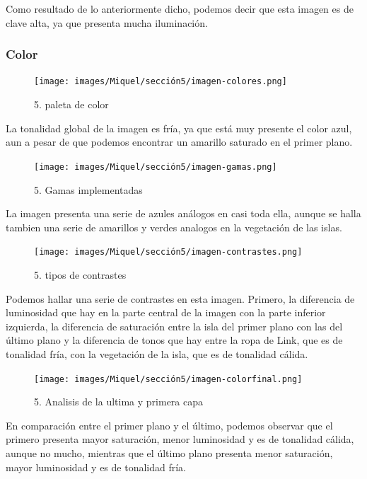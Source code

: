 \documentclass[12pt]{article}
\begin{document}
Como resultado de lo anteriormente dicho, podemos decir que esta imagen es de clave alta, ya que presenta mucha iluminación.

        \subsubsection{Color}

 \begin{figure}[H]
      \centering
      \texttt{[image: images/Miquel/sección5/imagen-colores.png]}
      \caption{\small 5. paleta de color}
    \end{figure}

     La tonalidad global de la imagen es fría, ya que está muy presente el color azul, aun a pesar de que podemos encontrar un amarillo saturado en el primer plano.  

\begin{figure}[H]
      \centering
      \texttt{[image: images/Miquel/sección5/imagen-gamas.png]}
      \caption{\small 5. Gamas implementadas}
    \end{figure}

    La imagen presenta una serie de azules análogos en casi toda ella, aunque se halla tambien una serie de amarillos y verdes analogos en la vegetación de las islas.

\begin{figure}[H]
      \centering
      \texttt{[image: images/Miquel/sección5/imagen-contrastes.png]}
      \caption{\small 5. tipos de contrastes}
    \end{figure}
    
    Podemos hallar una serie de contrastes en esta imagen. Primero, la diferencia de luminosidad que hay en la parte central de la imagen con la parte inferior izquierda, la diferencia de saturación entre  la isla del primer plano con las del último plano y la diferencia de tonos que hay entre la ropa de Link, que es de tonalidad fría, con la vegetación de la isla, que es de tonalidad cálida.

    \begin{figure}[H]
      \centering
      \texttt{[image: images/Miquel/sección5/imagen-colorfinal.png]}
      \caption{\small 5. Analisis de la ultima y primera capa}
    \end{figure}

    En comparación entre el primer plano y el último, podemos observar que el primero presenta mayor saturación, menor luminosidad y es de tonalidad cálida, aunque no mucho, mientras que el último plano presenta menor saturación, mayor luminosidad y es de tonalidad fría.
\end{document}
